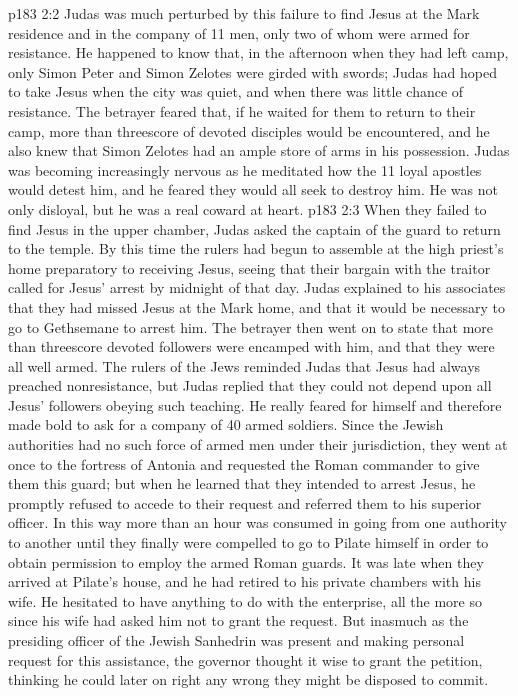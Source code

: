 \vs p183 2:2 Judas was much perturbed by this failure to find Jesus at the Mark residence and in the company of 11 men, only two of whom were armed for resistance. He happened to know that, in the afternoon when they had left camp, only Simon Peter and Simon Zelotes were girded with swords; Judas had hoped to take Jesus when the city was quiet, and when there was little chance of resistance. The betrayer feared that, if he waited for them to return to their camp, more than threescore of devoted disciples would be encountered, and he also knew that Simon Zelotes had an ample store of arms in his possession. Judas was becoming increasingly nervous as he meditated how the 11 loyal apostles would detest him, and he feared they would all seek to destroy him. He was not only disloyal, but he was a real coward at heart.
\vs p183 2:3 When they failed to find Jesus in the upper chamber, Judas asked the captain of the guard to return to the temple. By this time the rulers had begun to assemble at the high priest’s home preparatory to receiving Jesus, seeing that their bargain with the traitor called for Jesus’ arrest by midnight of that day. Judas explained to his associates that they had missed Jesus at the Mark home, and that it would be necessary to go to Gethsemane to arrest him. The betrayer then went on to state that more than threescore devoted followers were encamped with him, and that they were all well armed. The rulers of the Jews reminded Judas that Jesus had always preached nonresistance, but Judas replied that they could not depend upon all Jesus’ followers obeying such teaching. He really feared for himself and therefore made bold to ask for a company of 40 armed soldiers. Since the Jewish authorities had no such force of armed men under their jurisdiction, they went at once to the fortress of Antonia and requested the Roman commander to give them this guard; but when he learned that they intended to arrest Jesus, he promptly refused to accede to their request and referred them to his superior officer. In this way more than an hour was consumed in going from one authority to another until they finally were compelled to go to Pilate himself in order to obtain permission to employ the armed Roman guards. It was late when they arrived at Pilate’s house, and he had retired to his private chambers with his wife. He hesitated to have anything to do with the enterprise, all the more so since his wife had asked him not to grant the request. But inasmuch as the presiding officer of the Jewish Sanhedrin was present and making personal request for this assistance, the governor thought it wise to grant the petition, thinking he could later on right any wrong they might be disposed to commit.
